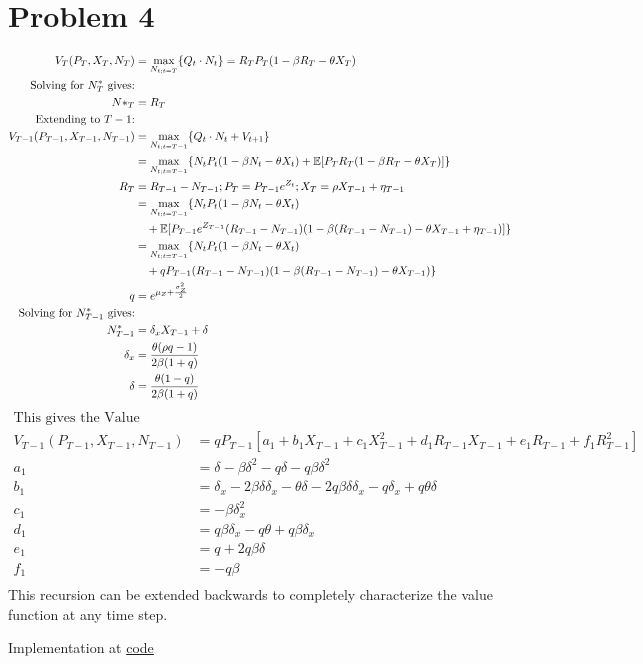 \documentclass[11pt]{article}
\begin{document}
\section*{Problem 4}
\begin{align}
    V_T(P_T, X_T, N_T) &= \max_{N_{t; t=T}}\{ Q_t\cdot N_t \} = R_TP_T(1-\beta R_T - \theta X_T) \\
    \text{Solving for $N^*_T$ gives:} \\
    N*_T &= R_T \\
    \text{Extending to $T-1$:} \\
    V_{T-1}(P_{T-1}, X_{T-1}, N_{T-1}) &= \max_{N_{t; t=T-1}} \{ Q_t\cdot N_t + V_{t+1}\}\\
    &= \max_{N_{t; t=T-1}}\{N_tP_t(1-\beta N_t - \theta X_t) + \mathbb{E}[P_TR_T(1-\beta R_T - \theta X_T)] \} \\
    R_T &= R_{T-1} - N_{T-1}; P_T = P_{T-1}e^{Z_t}; X_T = \rho X_{T-1} + \eta_{T-1} \\
    &= \max_{N_{t; t=T-1}}\{N_tP_t(1-\beta N_t - \theta X_t) \\
    &\quad+ \mathbb{E}[P_{T-1}e^{Z_{T-1}}(R_{T-1} - N_{T-1})(1-\beta (R_{T-1} - N_{T-1}) - \theta X_{T-1} + \eta_{T-1})] \} \\
    &= \max_{N_{t; t=T-1}}\{N_tP_t(1-\beta N_t - \theta X_t) \\
    &\quad+ q P_{T-1} (R_{T-1} - N_{T-1})(1-\beta (R_{T-1} - N_{T-1}) - \theta X_{T-1})\} \\
    q& = e^{\mu_Z + \frac{\sigma^2_Z}{2}} \\
    \text{Solving for $N^*_{T-1}$ gives:} \\
    N^*_{T-1} &= \delta_x X_{T-1} + \delta \\
    \delta_x &= \frac{\theta(\rho q - 1)}{2\beta(1 + q)} \\
    \delta &= \frac{\theta(1 - q)}{2\beta(1 + q)} \\
\end{align}
\begin{align}
    \text{This gives the Value Function as:} \\
    V_{T-1}(P_{T-1}, X_{T-1}, N_{T-1}) &= qP_{T-1}[a_1 + b_1X_{T-1} + c_1X_{T-1}^2 + d_1 R_{T-1}X_{T-1} + e_1R_{T-1} + f_1 R^2_{T-1}] \\
    a_1 &= \delta - \beta \delta^2 - q\delta - q\beta \delta^2\\
    b_1 &= \delta_x - 2\beta \delta \delta_x - \theta\delta - 2q\beta \delta\delta_x  - q\delta_x + q\theta\delta\\
    c_1 &= -\beta\delta_x^2\\
    d_1 &= q\beta\delta_x - q\theta + q\beta\delta_x\\
    e_1 &= q + 2q\beta\delta\\
    f_1 &= -q\beta\\
\end{align}
This recursion can be extended backwards to completely characterize the value function at any time step.

Implementation at \href{https://github.com/MatthewWilsonThomas/CME241-RLForFinance/blob/master/Problem%20Sets/Assignment_5/Q4-LPT.py}{code}
\end{document}
